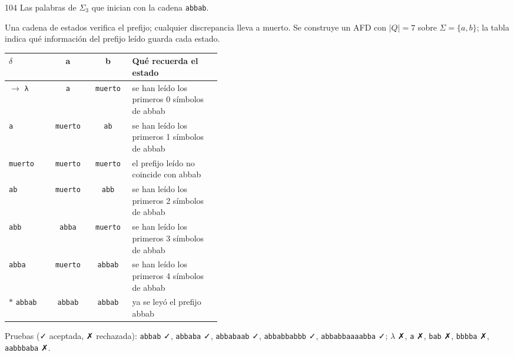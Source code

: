 \documentclass[11pt]{article}
\begin{document}
\begin{ejercicio}{104}{}
Las palabras de $\Sigma_3$ que inician con la cadena \texttt{abbab}.
\end{ejercicio}
\proc Una cadena de estados verifica el prefijo; cualquier discrepancia lleva a muerto. Se construye un AFD con $|Q| = 7$ sobre $\Sigma = \{a, b\}$; la tabla indica qué información del prefijo leído guarda cada estado.
\begin{center}\small\begin{tabular}{lccp{0.42\linewidth}}\toprule
$\delta$ & a & b & Qué recuerda el estado \\\midrule
$\to$ \texttt{λ} & \texttt{a} & \texttt{muerto} & se han leído los primeros 0 símbolos de abbab \\
 \texttt{a} & \texttt{muerto} & \texttt{ab} & se han leído los primeros 1 símbolos de abbab \\
 \texttt{muerto} & \texttt{muerto} & \texttt{muerto} & el prefijo leído no coincide con abbab \\
 \texttt{ab} & \texttt{muerto} & \texttt{abb} & se han leído los primeros 2 símbolos de abbab \\
 \texttt{abb} & \texttt{abba} & \texttt{muerto} & se han leído los primeros 3 símbolos de abbab \\
 \texttt{abba} & \texttt{muerto} & \texttt{abbab} & se han leído los primeros 4 símbolos de abbab \\
$*$ \texttt{abbab} & \texttt{abbab} & \texttt{abbab} & ya se leyó el prefijo abbab \\
\bottomrule\end{tabular}\end{center}
Pruebas (✓ aceptada, ✗ rechazada): \texttt{abbab} ✓, \texttt{abbaba} ✓, \texttt{abbabaab} ✓, \texttt{abbabbabbb} ✓, \texttt{abbabbaaaabba} ✓; $\lambda$ ✗, \texttt{a} ✗, \texttt{bab} ✗, \texttt{bbbba} ✗, \texttt{aabbbaba} ✗.
\end{document}

